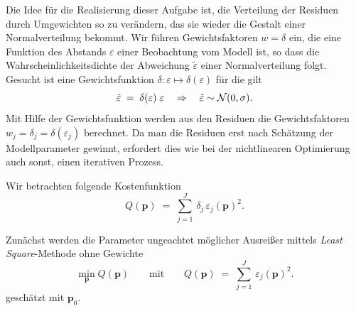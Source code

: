 Die Idee für die Realisierung dieser Aufgabe ist, die Verteilung der Residuen durch Umgewichten so zu verändern, das
sie wieder die Gestalt einer Normalverteilung bekommt. Wir führen Gewichtsfaktoren $w = \delta$ ein,
die eine Funktion des Abstands $\varepsilon$ einer Beobachtung vom Modell ist, so dass die Wahrscheinlichkeitsdichte
der Abweichung $\tilde \varepsilon$ einer Normalverteilung folgt. Gesucht ist eine Gewichtsfunktion
$\delta \! : \varepsilon \mapsto \delta(\varepsilon)$ für die gilt
\begin{equation}
\tilde \varepsilon \; = \; \delta(\varepsilon) \; \varepsilon \quad \Rightarrow
\quad \tilde \varepsilon \sim {\cal N}(0,\sigma) .
\end{equation}
Mit Hilfe der Gewichtsfunktion werden aus den Residuen die Gewichtsfaktoren
$w_j = \delta_j = \delta(\varepsilon_j)$ berechnet. Da man die Residuen erst nach
Schätzung der Modellparameter gewinnt, erfordert dies wie bei der nichtlinearen Optimierung
auch sonst, einen iterativen Prozess.

Wir betrachten folgende Kostenfunktion
\begin{equation}
Q(\mathbf{p}) \; = \; \sum_{j=1}^J \, \delta_j \, \varepsilon_j(\mathbf{p})^2 .
\label{robustEstim}
\end{equation}

Zunächst werden die Parameter ungeachtet möglicher Ausreißer mittels \textsl{Least Square}-Methode
ohne Gewichte
\begin{equation}
 \min_{\mathbf{p}} Q(\mathbf{p}) \qquad \mathrm{mit} \qquad
Q(\mathbf{p}) \; = \; \sum_{j=1}^J \, \varepsilon_j(\mathbf{p})^2 .
\label{linEstim}
\end{equation}
geschätzt mit $\mathbf{p}_0$.

